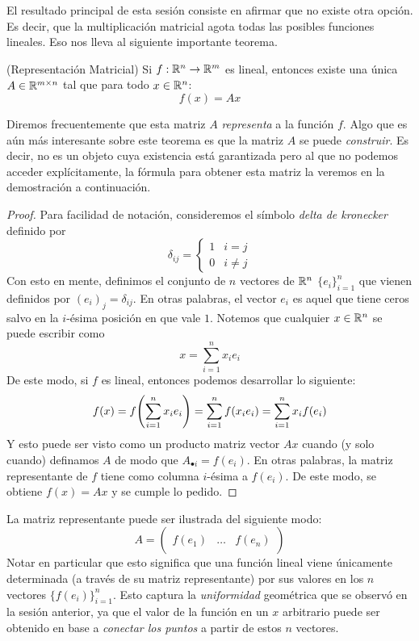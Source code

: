 El resultado principal de esta sesión consiste en afirmar que no existe otra opción. Es decir, que la multiplicación matricial agota todas las posibles funciones lineales. Eso nos lleva al siguiente importante teorema.

\begin{theorem}(Representación Matricial)
    Si $f: \mathbb{R}^n \to \mathbb{R}^m$ es lineal, entonces existe una única $A \in \mathbb{R}^{m \times n}$ tal que para todo $x \in \mathbb{R}^n$:
    \[f(x) = Ax\]
\end{theorem}
Diremos frecuentemente que esta matriz $A$ \textit{representa} a la función $f$. Algo que es aún más interesante sobre este teorema es que la matriz $A$ se puede \textit{construir}. Es decir, no es un objeto cuya existencia está garantizada pero al que no podemos acceder explícitamente, la fórmula para obtener esta matriz la veremos en la demostración a continuación.

\begin{proof}
    Para facilidad de notación, consideremos el símbolo \textit{delta de kronecker} definido por
    \[\delta_{ij} = \begin{cases}
        1 & i = j \\
        0 & i \neq j
    \end{cases}\]
    Con esto en mente, definimos el conjunto de $n$ vectores de $\mathbb{R}^n$ $\{e_i\}_{i=1}^n$ que vienen definidos por $(e_i)_j = \delta_{ij}$. En otras palabras, el vector $e_i$ es aquel que tiene ceros salvo en la $i$-ésima posición en que vale $1$. Notemos que cualquier $x \in \mathbb{R}^n$ se puede escribir como
    \[x = \sum_{i=1}^n x_i e_i\]
    De este modo, si $f$ es lineal, entonces podemos desarrollar lo siguiente:
    \[f(x) = f\qty(\sum_{i=1}^n x_i e_i) = \sum_{i=1}^n f(x_i e_i) = \sum_{i=1}^n x_i f(e_i)\]
    Y esto puede ser visto como un producto matriz vector $Ax$ cuando (y solo cuando) definamos $A$ de modo que $A_{\bullet i} = f(e_i)$. En otras palabras, la matriz representante de $f$ tiene como columna $i$-ésima a $f(e_i)$. De este modo, se obtiene $f(x) = Ax$ y se cumple lo pedido.
\end{proof}

\begin{remark}
    La matriz representante puede ser ilustrada del siguiente modo:
    \[A = \begin{pmatrix} & & \\ f(e_1) & \dots & f(e_n) \\ & & \end{pmatrix}\]
    Notar en particular que esto significa que una función lineal viene únicamente determinada (a través de su matriz representante) por sus valores en los $n$ vectores $\{f(e_i)\}_{i=1}^n$. Esto captura la \textit{uniformidad} geométrica que se observó en la sesión anterior, ya que el valor de la función en un $x$ arbitrario puede ser obtenido en base a \textit{conectar los puntos} a partir de estos $n$ vectores.
\end{remark}

